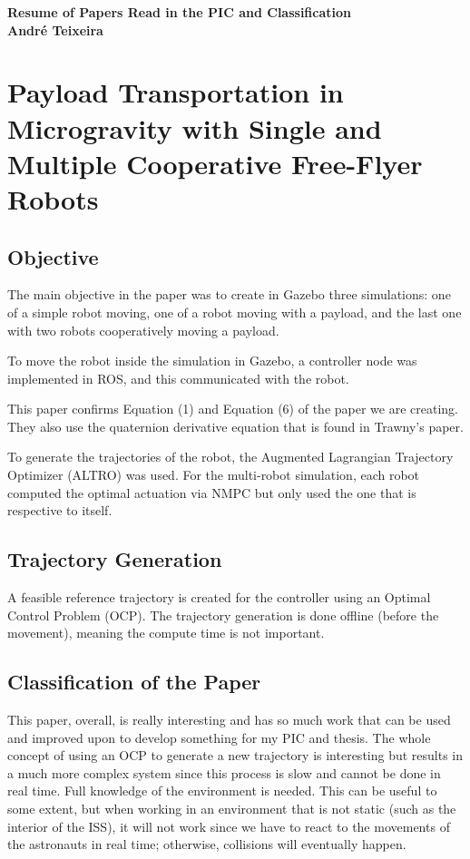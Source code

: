 \documentclass[a4paper,12pt]{article}
\begin{document}
\begin{titlepage}
	\centering
	\vspace*{1in}
	{\Huge \textbf{Resume of Papers Read in the PIC and Classification}} \\
	\vspace{1.5in}
	{\large \textbf{André Teixeira}} \\
	\vfill
\end{titlepage}

\tableofcontents

\clearpage

\section{Payload Transportation in Microgravity with Single and Multiple Cooperative Free-Flyer Robots}

\subsection{Objective}
The main objective in the paper was to create in Gazebo three simulations: one of a simple robot moving, one of a robot moving with a payload, and the last one with two robots cooperatively moving a payload.

To move the robot inside the simulation in Gazebo, a controller node was implemented in ROS, and this communicated with the robot.

This paper confirms Equation (1) and Equation (6) of the paper we are creating. They also use the quaternion derivative equation that is found in Trawny's paper.

To generate the trajectories of the robot, the Augmented Lagrangian Trajectory Optimizer (ALTRO) was used. For the multi-robot simulation, each robot computed the optimal actuation via NMPC but only used the one that is respective to itself.

\subsection{Trajectory Generation}
A feasible reference trajectory is created for the controller using an Optimal Control Problem (OCP). The trajectory generation is done offline (before the movement), meaning the compute time is not important.

\subsection{Classification of the Paper}
This paper, overall, is really interesting and has so much work that can be used and improved upon to develop something for my PIC and thesis. The whole concept of using an OCP to generate a new trajectory is interesting but results in a much more complex system since this process is slow and cannot be done in real time. Full knowledge of the environment is needed. This can be useful to some extent, but when working in an environment that is not static (such as the interior of the ISS), it will not work since we have to react to the movements of the astronauts in real time; otherwise, collisions will eventually happen.
\end{document}
